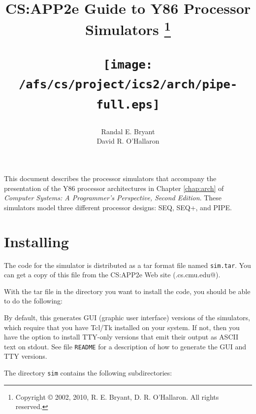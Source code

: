 \documentclass[11pt]{article}
\begin{document}


\title{CS:APP2e Guide to Y86 Processor Simulators%
\thanks{Copyright \copyright{} 2002, 2010, R. E. Bryant, D. R.
O'Hallaron.  All rights reserved.}\\
\vspace*{0.75in}
\centerline{\texttt{[image: /afs/cs/project/ics2/arch/pipe-full.eps]}}
}

\author{Randal E. Bryant\\ David R. O'Hallaron}

\maketitle



This document describes the processor simulators that accompany the
presentation of the Y86 processor architectures in Chapter
\ref{chap:arch} of {\em Computer Systems: A Programmer's Perspective,
  Second Edition}.  
These simulators model three different processor designs: SEQ, SEQ+,
and PIPE\@.

\section{Installing}

The code for the simulator is distributed as a tar format file named
 \texttt{sim.tar}.  You can get a copy of this file from the CS:APP2e
 Web site (\verb@csapp.cs.cmu.edu@).


With the tar file in the directory you want to install the code, you
should be able to do the following:
\begin{tty}
\end{tty}

By default, this generates GUI (graphic user interface) versions of
the simulators, which require that you have Tcl/Tk installed on your
system. If not, then you have the option to install TTY-only
versions that emit their output as ASCII text on
stdout. See file {\tt README} for a description of
how to generate the GUI and TTY versions.

The directory \texttt{sim} contains the following subdirectories:
\end{document}

